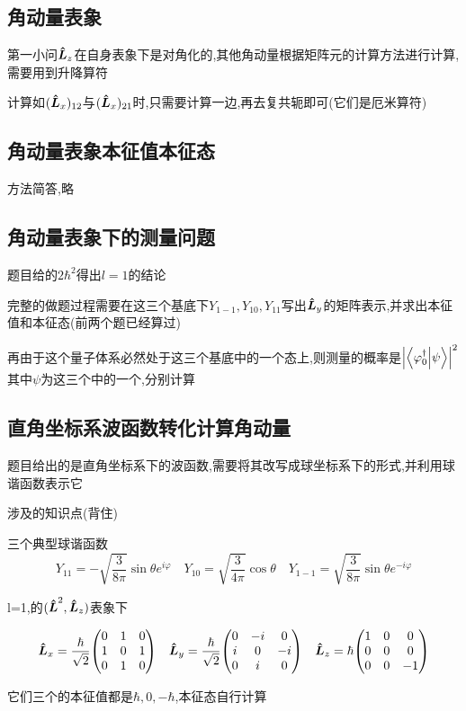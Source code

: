 \documentclass{article}
\begin{document}
        \subsection{角动量表象}
            第一小问$\vu*{L}_{z}$在自身表象下是对角化的,其他角动量根据矩阵元的计算方法进行计算,需要用到升降算符

            计算如$(\vu*{L}_{x})_{12}$与$(\vu*{L}_{x})_{21}$时,只需要计算一边,再去复共轭即可(它们是厄米算符)

        \subsection{角动量表象本征值本征态}
            方法简答,略

        \subsection{角动量表象下的测量问题}
            题目给的$2\hbar^{2}$得出$l=1$的结论

            完整的做题过程需要在这三个基底下$Y_{1-1},Y_{10},Y_{11}$写出$\vu*{L}_{y}$的矩阵表示,并求出本征值和本征态(前两个题已经算过)

            再由于这个量子体系必然处于这三个基底中的一个态上,则测量的概率是$\abs{\braket{\varphi_{0}^{\dagger}}{\psi}}^{2}$其中$\psi$为这三个中的一个,分别计算
            
        \subsection{直角坐标系波函数转化计算角动量}
            题目给出的是直角坐标系下的波函数,需要将其改写成球坐标系下的形式,并利用球谐函数表示它

            \begin{formal}
                涉及的知识点(背住)

                三个典型球谐函数
                $$ Y_{11} = -\sqrt{\frac{3}{8\pi}} \sin{\theta} e^{i\varphi} \quad Y_{10} = \sqrt{\frac{3}{4\pi}}\cos{\theta} \quad Y_{1-1} = \sqrt{\frac{3}{8\pi}} \sin{\theta} e^{-i\varphi}  $$

                l=1,的$(\vu*{L}^{2},\vu*{L}_{z})$表象下

                $$ 
                \vu*{L}_{x} = \frac{\hbar}{\sqrt{2}} \mqty(0 & 1 & 0 \\ 1 & 0 & 1 \\ 0 & 1 & 0) \quad 
                \vu*{L}_{y} = \frac{\hbar}{\sqrt{2}} \mqty(0 & -i & 0 \\ i & 0 & -i \\ 0 & i & 0) \quad 
                \vu*{L}_{z} = \hbar \mqty(1 & 0 & 0 \\ 0 & 0 & 0 \\ 0 & 0 & -1)
                $$

                它们三个的本征值都是$\hbar,0,-\hbar$,本征态自行计算

            \end{formal}
\end{document}
